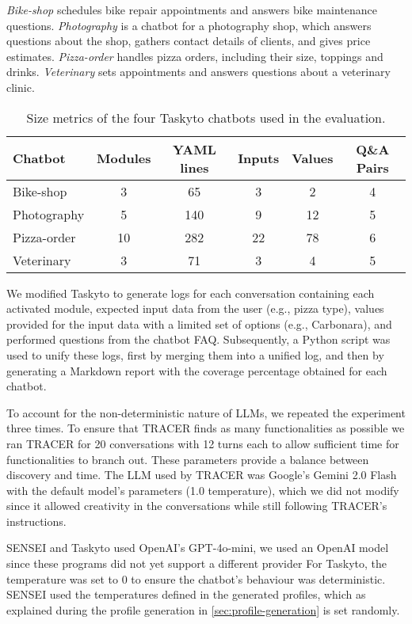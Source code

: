 \textit{Bike-shop} schedules bike repair appointments
and answers bike maintenance questions.
\textit{Photography} is a chatbot for a photography shop,
which answers questions about the shop,
gathers contact details of clients, and gives price estimates.
\textit{Pizza-order} handles pizza orders,
including their size, toppings and drinks.
\textit{Veterinary} sets appointments and answers questions about a veterinary clinic.

\begin{table}[htpb]
\centering
\caption{Size metrics of the four Taskyto chatbots used in the evaluation.}
\label{tab:rq1_chatbots}
\begin{tabular}{@{}lccccc@{}}
\toprule
\textbf{Chatbot} & \textbf{Modules} & \textbf{YAML lines} & \textbf{Inputs} & \textbf{Values} & \textbf{Q\&A Pairs} \\ \midrule
Bike-shop & 3 & 65 & 3 & 2 & 4 \\
Photography & 5 & 140 & 9 & 12 & 5 \\
Pizza-order & 10 & 282 & 22 & 78 & 6 \\
Veterinary & 3 & 71 & 3 & 4 & 5 \\ \bottomrule
\end{tabular}
\end{table}

We modified Taskyto to generate logs
for each conversation containing
each activated module,
expected input data from the user (e.g., pizza type),
values provided for the input data with a limited set of options (e.g., Carbonara),
and performed questions from the chatbot FAQ.
Subsequently, a Python script was used to unify these logs,
first by merging them into a unified log,
and then by generating a Markdown report
with the coverage percentage obtained for each chatbot.

To account for the non-deterministic nature of \acp{LLM},
we repeated the experiment three times.
To ensure that \ac{TRACER} finds as many functionalities as possible
we ran TRACER for 20 conversations with 12 turns each
to allow sufficient time for functionalities to branch out.
These parameters provide a balance between discovery and time.
The \ac{LLM} used by \ac{TRACER} was Google's Gemini 2.0 Flash
with the default model's parameters (1.0 temperature),
which we did not modify since it allowed creativity in the conversations
while still following \ac{TRACER}'s instructions.

SENSEI and Taskyto used OpenAI's GPT-4o-mini,
we used an OpenAI model
since these programs did not yet support a different provider
For Taskyto, the temperature was set to 0
to ensure the chatbot's behaviour was deterministic.
SENSEI used the temperatures defined in the generated profiles,
which as explained during the profile generation in \autoref{sec:profile-generation}
is set randomly.

